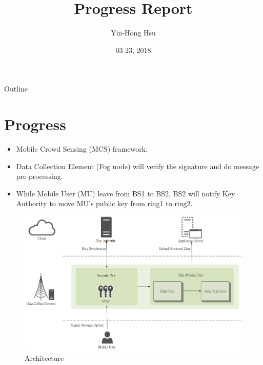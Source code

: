 \documentclass{beamer}
\title {
    Progress Report
}
\author {
    Yin-Hong Hsu
}
\date {
    03 23, 2018
}
\begin{document}
\begin{frame}
    \titlepage
\end{frame}


\begin{frame}{Outline}
    \tableofcontentsgather
    \tableofcontents
\end{frame}

\section{Progress}
\begin{frame}{}
    \begin{itemize}
        \item {Mobile Crowd Sensing (MCS) framework.}
        \item {Data Collection Element (Fog node) will verify the signature and do message pre-processing.}
        \item {While Mobile User (MU) leave from BS1 to BS2, BS2 will notify Key Authority to move MU's public key from ring1 to ring2.}
    \end{itemize}
\end{frame}
\begin{frame}{}
    \begin{figure}[t]
        \centering
        \includegraphics[width=1.0\textwidth]{figures/1.png}
        \caption{Architecture}
    \end{figure}
\end{frame}
\end{document}
